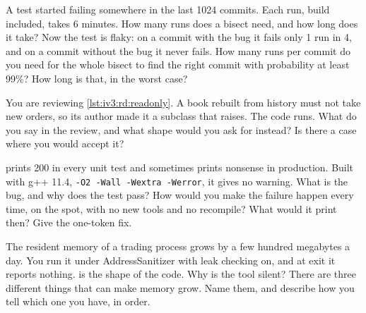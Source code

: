 \begin{question}\label{iq:iv3:reading-debugging-and-software-design:28}
A test started failing somewhere in the last 1024 commits. Each run, build included, takes 6 minutes. How many runs does a bisect need, and how long does it take? Now the test is flaky: on a commit with the bug it fails only 1 run in 4, and on a commit without the bug it never fails. How many runs per commit do you need for the whole bisect to find the right commit with probability at least 99\%? How long is that, in the worst case?
\end{question}

\begin{question}\label{iq:iv3:reading-debugging-and-software-design:29}
You are reviewing \cref{lst:iv3:rd:readonly}. A book rebuilt from history must not take new orders, so its author made it a subclass that raises. The code runs. What do you say in the review, and what shape would you ask for instead? Is there a case where you would accept it?
\label{lst:iv3:rd:readonly}
\end{question}

\begin{question}\label{iq:iv3:reading-debugging-and-software-design:30}
 prints 200 in every unit test and sometimes prints nonsense in production. Built with g++ 11.4, \texttt{-O2 -Wall -Wextra -Werror}, it gives no warning. What is the bug, and why does the test pass? How would you make the failure happen every time, on the spot, with no new tools and no recompile? What would it print then? Give the one-token fix.
\label{lst:iv3:rd:uninit}
\end{question}

\begin{question}\label{iq:iv3:reading-debugging-and-software-design:31}
The resident memory of a trading process grows by a few hundred megabytes a day. You run it under AddressSanitizer with leak checking on, and at exit it reports nothing.  is the shape of the code. Why is the tool silent? There are three different things that can make memory grow. Name them, and describe how you tell which one you have, in order.
\label{lst:iv3:rd:growth}
\end{question}

